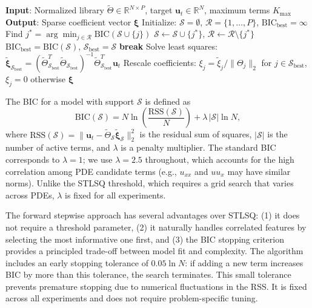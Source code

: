 \documentclass[preprint,12pt]{elsarticle}
\begin{document}
\begin{algorithm}[H]
\caption{Forward Stepwise BIC for Sparse PDE Discovery}
\label{alg:stepwise}
\begin{algorithmic}[1]
\STATE \textbf{Input}: Normalized library $\tilde{\Theta} \in \mathbb{R}^{N \times P}$, target $\mathbf{u}_t \in \mathbb{R}^N$, maximum terms $K_{\max}$
\STATE \textbf{Output}: Sparse coefficient vector $\boldsymbol{\xi}$
\STATE Initialize: $\mathcal{S} = \emptyset$, $\mathcal{R} = \{1, \ldots, P\}$, $\text{BIC}_{\text{best}} = \infty$
    \STATE Find $j^* = \arg\min_{j \in \mathcal{R}} \text{BIC}(\mathcal{S} \cup \{j\})$
    \STATE $\mathcal{S} \leftarrow \mathcal{S} \cup \{j^*\}$, $\mathcal{R} \leftarrow \mathcal{R} \setminus \{j^*\}$
        \STATE $\text{BIC}_{\text{best}} = \text{BIC}(\mathcal{S})$, $\mathcal{S}_{\text{best}} = \mathcal{S}$
        \STATE \textbf{break}
    \ENDIF
\ENDFOR
\STATE Solve least squares: $\tilde{\boldsymbol{\xi}}_{\mathcal{S}_{\text{best}}} = (\tilde{\Theta}_{\mathcal{S}_{\text{best}}}^T \tilde{\Theta}_{\mathcal{S}_{\text{best}}})^{-1} \tilde{\Theta}_{\mathcal{S}_{\text{best}}}^T \mathbf{u}_t$
\STATE Rescale coefficients: $\xi_j = \tilde{\xi}_j / \|\Theta_j\|_2$ for $j \in \mathcal{S}_{\text{best}}$, $\xi_j = 0$ otherwise
\RETURN $\boldsymbol{\xi}$
\end{algorithmic}
\end{algorithm}

The BIC for a model with support $\mathcal{S}$ is defined as
\begin{equation}
\text{BIC}(\mathcal{S}) = N \ln\left(\frac{\text{RSS}(\mathcal{S})}{N}\right) + \lambda \, |\mathcal{S}| \ln N,
\end{equation}
where $\text{RSS}(\mathcal{S}) = \|\mathbf{u}_t - \tilde{\Theta}_{\mathcal{S}} \tilde{\boldsymbol{\xi}}_{\mathcal{S}}\|_2^2$ is the residual sum of squares, $|\mathcal{S}|$ is the number of active terms, and $\lambda$ is a penalty multiplier. The standard BIC corresponds to $\lambda = 1$; we use $\lambda = 2.5$ throughout, which accounts for the high correlation among PDE candidate terms (e.g., $u_{xx}$ and $u u_x$ may have similar norms). Unlike the STLSQ threshold, which requires a grid search that varies across PDEs, $\lambda$ is fixed for all experiments.

The forward stepwise approach has several advantages over STLSQ: (1) it does not require a threshold parameter, (2) it naturally handles correlated features by selecting the most informative one first, and (3) the BIC stopping criterion provides a principled trade-off between model fit and complexity. The algorithm includes an early stopping tolerance of $0.05\ln N$: if adding a new term increases BIC by more than this tolerance, the search terminates. This small tolerance prevents premature stopping due to numerical fluctuations in the RSS. It is fixed across all experiments and does not require problem-specific tuning.
\end{document}
